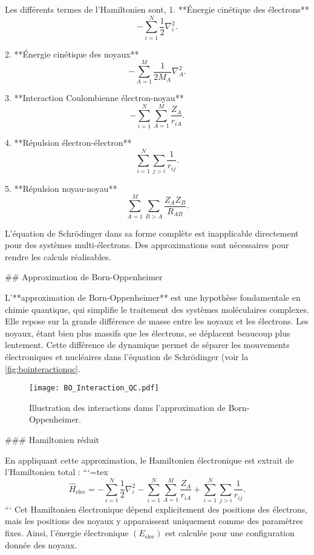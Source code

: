 \documentclass[12pt,a4paper]{report}
\numberwithin{equation}{section}
\numberwithin{figure}{section}
\numberwithin{table}{section}
\begin{document}
\begin{markdown}
Les différents termes de l'Hamiltonien sont,
1. **Énergie cinétique des électrons**
   \begin{equation}
   -\sum_{i=1}^N \frac12 \nabla_i^2.
   \end{equation}

2. **Énergie cinétique des noyaux**
   \begin{equation}
   -\sum_{A=1}^M \frac{1}{2M_A} \nabla_A^2 .
   \end{equation}

3. **Interaction Coulombienne électron-noyau**
   \begin{equation}
   -\sum_{i=1}^N \sum_{A=1}^M \frac{Z_A}{r_{iA}} .
   \end{equation}

4. **Répulsion électron-électron**
   \begin{equation}
   \sum_{i=1}^N \sum_{j>i} \frac{1}{r_{ij}} .
   \end{equation}

5. **Répulsion noyau-noyau**
   \begin{equation}
   \sum_{A=1}^M \sum_{B>A} \frac{Z_A Z_B}{R_{AB}} .
   \end{equation}

L'équation de Schrödinger dans sa forme complète est inapplicable directement pour des systèmes multi-électrons. Des approximations sont nécessaires pour rendre les calculs réalisables.


## Approximation de Born-Oppenheimer

L'**approximation de Born-Oppenheimer** est une hypothèse fondamentale en chimie quantique, qui simplifie le traitement des systèmes moléculaires complexes. Elle repose sur la grande différence de masse entre les noyaux et les électrons. Les noyaux, étant bien plus massifs que les électrons, se déplacent beaucoup plus lentement. Cette différence de dynamique permet de séparer les mouvements électroniques et nucléaires dans l’équation de Schrödinger (voir la \autoref{fig:bointeractionqc}.

\begin{figure}[tbph]
\centering
\texttt{[image: BO\_Interaction\_QC.pdf]}
\caption{Illustration des interactions dams l'approximation de Born-Oppenheimer.}
\label{fig:bointeractionqc}
\end{figure}

### Hamiltonien réduit

En appliquant cette approximation, le Hamiltonien électronique est extrait de l'Hamiltonien total :
```{=tex}
\begin{equation}
\hat{H}_{\text{elec}} = -\sum_{i=1}^N \frac12 \nabla_i^2 - \sum_{i=1}^N \sum_{A=1}^M \frac{Z_A}{r_{iA}} + \sum_{i=1}^N \sum_{j>i} \frac{1}{r_{ij}} .
\end{equation}
```
Cet Hamiltonien électronique dépend explicitement des positions des électrons, mais les positions des noyaux y apparaissent uniquement comme des paramètres fixes. Ainsi, l'énergie électronique $(E_{\text{elec}})$ est calculée pour une configuration donnée des noyaux.


\end{markdown}
\end{document}
